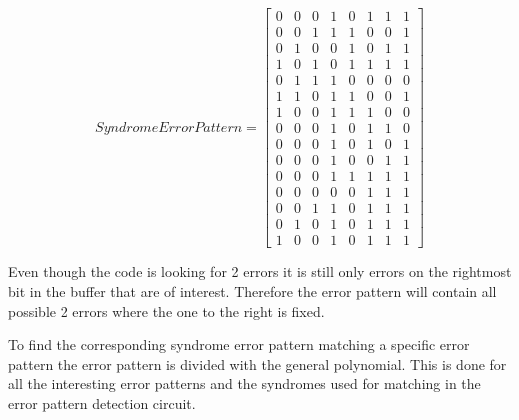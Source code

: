 \documentclass[Main]{subfiles}
\begin{document}
\begin{equation}
\label{lst:syndromeErrorPattern}
Syndrome Error Pattern = 
\begin{bmatrix}
     0 &    0 &    0 &    1 &    0 &    1 &    1  &   1\\
     0 &    0 &    1 &    1 &    1 &    0 &    0  &   1\\
     0 &    1 &    0 &    0 &    1 &    0 &    1  &   1\\
     1 &    0 &    1 &    0 &    1 &    1 &    1  &   1\\
     0 &    1 &    1 &    1 &    0 &    0 &    0  &   0\\
     1 &    1 &    0 &    1 &    1 &    0 &    0  &   1\\
     1 &    0 &    0 &    1 &    1 &    1 &    0  &   0\\
     0 &    0 &    0 &    1 &    0 &    1 &    1  &   0\\
     0 &    0 &    0 &    1 &    0 &    1 &    0  &   1\\
     0 &    0 &    0 &    1 &    0 &    0 &    1  &   1\\
     0 &    0 &    0 &    1 &    1 &    1 &    1  &   1\\
     0 &    0 &    0 &    0 &    0 &    1 &    1  &   1\\
     0 &    0 &    1 &    1 &    0 &    1 &    1  &   1\\
     0 &    1 &    0 &    1 &    0 &    1 &    1  &   1\\
     1 &    0 &    0 &    1 &    0 &    1 &    1  &   1
\end{bmatrix}
\end{equation}

Even though the code is looking for 2 errors it is still only errors on the rightmost bit in the buffer that are of interest.
Therefore the error pattern will contain all possible 2 errors where the one to the right is fixed.

To find the corresponding syndrome error pattern matching a specific error pattern the error pattern is divided with the general polynomial.
This is done for all the interesting error patterns and the syndromes used for matching in the error pattern detection circuit.
\end{document}
